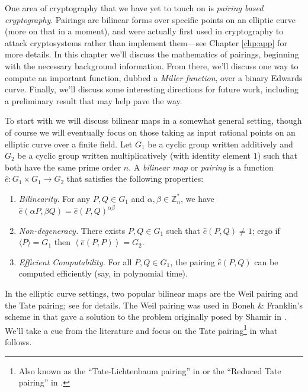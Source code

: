 \label{chp:pair}

One area of cryptography that we have yet to touch on is \textit{pairing based
    cryptography}.
Pairings are bilinear forms over specific points on an elliptic curve (more on
    that in a moment), and were actually first used in cryptography to attack
    cryptosystems rather than implement them---see Chapter \ref{chp:app} for
    more details.
In this chapter we'll discuss the mathematics of pairings, beginning with the
    necessary background information.
From there, we'll discuss one way to compute an important function, dubbed a
    \textit{Miller function}, over a binary Edwards curve.
Finally, we'll discuss some interesting directions for future work, including a
    preliminary result that may help pave the way.


To start with  we will discuss bilinear maps in a somewhat general setting,
    though of course we will eventually focus on those taking as input rational
    points on an elliptic curve over a finite field.
Let $G_1$ be a cyclic group written additively and $G_2$ be a cyclic group
    written multiplicatively (with identity element $1$) such that both have
    the same prime order $n$.
A \textit{bilinear map} or \textit{pairing} is a function $\widehat{e}: G_1
    \times G_1 \to G_2$ that satisfies the following properties:
\begin{enumerate}
\item \textit{Bilinearity.} For any $P, Q \in G_1$ and $\alpha, \beta \in
    \mathbb{Z}_n^\ast$, we have $\widehat{e}(\alpha P, \beta Q) = \widehat{e}(P
    , Q)^{\alpha\beta}$
    
\item \textit{Non-degeneracy.} There exists $P, Q \in G_1$ such that
    $\widehat{e}(P, Q) \ne 1$; ergo if $\langle P \rangle = G_1$ then
    $\left\langle\widehat{e}(P,P)\right\rangle = G_2$.

\item \textit{Efficient Computability.} For all $P, Q \in G_1$, the pairing
    $\widehat{e}(P, Q)$ can be computed efficiently (say, in polynomial time).
\end{enumerate}

In the elliptic curve settings, two popular bilinear maps are the Weil pairing
    and the Tate pairing; see \cite{cohen2006handbook, silverman2009arithmetic,
    washington2008elliptic} for details.
The Weil pairing was used in Boneh \& Franklin's scheme in
    \cite{boneh2001identity} that gave a solution to the problem originally
    posed by Shamir in \cite{shamir1985identity}.
We'll take a cue from the literature and focus on the Tate
    pairing\footnote{Also known as the ``Tate-Lichtenbaum pairing'' in
    \cite{silverman2009arithmetic} or the ``Reduced Tate pairing'' in
    \cite{arene2011faster}.} in what follows.

